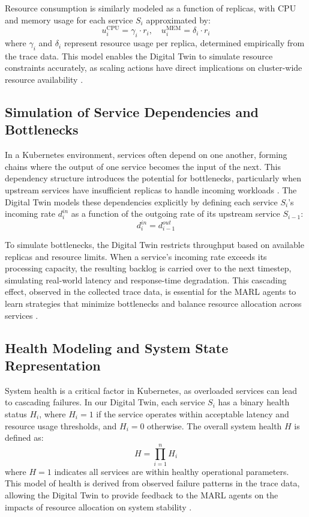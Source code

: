 \documentclass[conference]{IEEEtran}
\begin{document}
Resource consumption is similarly modeled as a function of replicas, with CPU and memory usage for each service $S_i$ approximated by:
\begin{equation}
    u_i^{\text{CPU}} = \gamma_i \cdot r_i, \quad u_i^{\text{MEM}} = \delta_i \cdot r_i
\end{equation}
where $\gamma_i$ and $\delta_i$ represent resource usage per replica, determined empirically from the trace data. This model enables the Digital Twin to simulate resource constraints accurately, as scaling actions have direct implications on cluster-wide resource availability \cite{schleich_digital_twin}.

\subsection{Simulation of Service Dependencies and Bottlenecks}

In a Kubernetes environment, services often depend on one another, forming chains where the output of one service becomes the input of the next. This dependency structure introduces the potential for bottlenecks, particularly when upstream services have insufficient replicas to handle incoming workloads \cite{zhang_marl_k8s}. The Digital Twin models these dependencies explicitly by defining each service $S_i$'s incoming rate $d_i^{in}$ as a function of the outgoing rate of its upstream service $S_{i-1}$:
\begin{equation}
    d_i^{in} = d_{i-1}^{out}
\end{equation}

To simulate bottlenecks, the Digital Twin restricts throughput based on available replicas and resource limits. When a service’s incoming rate exceeds its processing capacity, the resulting backlog is carried over to the next timestep, simulating real-world latency and response-time degradation. This cascading effect, observed in the collected trace data, is essential for the MARL agents to learn strategies that minimize bottlenecks and balance resource allocation across services \cite{rosenberg_k8s_autoscaling}.

\subsection{Health Modeling and System State Representation}

System health is a critical factor in Kubernetes, as overloaded services can lead to cascading failures. In our Digital Twin, each service $S_i$ has a binary health status $H_i$, where $H_i = 1$ if the service operates within acceptable latency and resource usage thresholds, and $H_i = 0$ otherwise. The overall system health $H$ is defined as:
\begin{equation}
    H = \prod_{i=1}^{n} H_i
\end{equation}
where $H = 1$ indicates all services are within healthy operational parameters. This model of health is derived from observed failure patterns in the trace data, allowing the Digital Twin to provide feedback to the MARL agents on the impacts of resource allocation on system stability \cite{schwartz_drl_cloud}.
\end{document}
